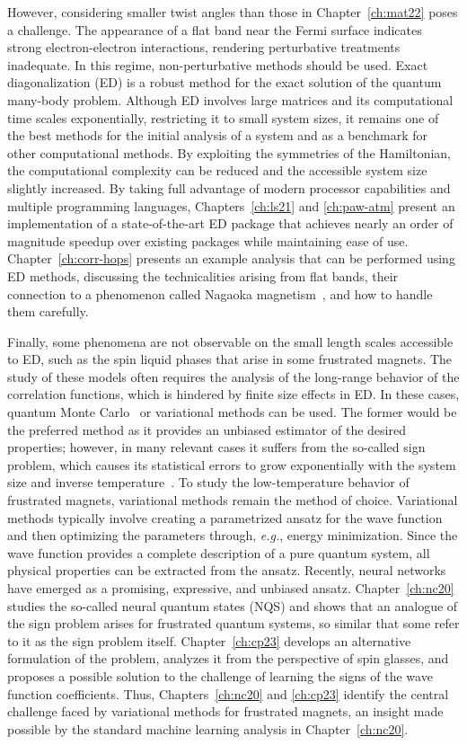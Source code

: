However, considering smaller twist angles than those in Chapter~\ref{ch:mat22} poses a challenge. The appearance of a flat band near the Fermi surface indicates strong electron-electron interactions, rendering perturbative treatments inadequate. In this regime, non-perturbative methods should be used. Exact diagonalization (ED) is a robust method for the exact solution of the quantum many-body problem. Although ED involves large matrices and its computational time scales exponentially, restricting it to small system sizes, it remains one of the best methods for the initial analysis of a system and as a benchmark for other computational methods. By exploiting the symmetries of the Hamiltonian, the computational complexity can be reduced and the accessible system size slightly increased. By taking full advantage of modern processor capabilities and multiple programming languages, Chapters~\ref{ch:ls21} and \ref{ch:paw-atm} present an implementation of a state-of-the-art ED package that achieves nearly an order of magnitude speedup over existing packages while maintaining ease of use. Chapter~\ref{ch:corr-hops} presents an example analysis that can be performed using ED methods, discussing the technicalities arising from flat bands, their connection to a phenomenon called Nagaoka magnetism~\cite{Nagaok_1966_Ferromagnetism}, and how to handle them carefully.

Finally, some phenomena are not observable on the small length scales accessible to ED, such as the spin liquid phases that arise in some frustrated magnets. The study of these models often requires the analysis of the long-range behavior of the correlation functions, which is hindered by finite size effects in ED. In these cases, quantum Monte Carlo~\cite{Sandvi_1991_Quantum_Monte_C} or variational methods can be used. The former would be the preferred method as it provides an unbiased estimator of the desired properties; however, in many relevant cases it suffers from the so-called sign problem, which causes its statistical errors to grow exponentially with the system size and inverse temperature~\cite{NP_Troyer}. To study the low-temperature behavior of frustrated magnets, variational methods remain the method of choice. Variational methods typically involve creating a parametrized ansatz for the wave function and then optimizing the parameters through, \textit{e.g.}, energy minimization. Since the wave function provides a complete description of a pure quantum system, all physical properties can be extracted from the ansatz. Recently, neural networks have emerged as a promising, expressive, and unbiased ansatz. Chapter~\ref{ch:nc20} studies the so-called neural quantum states (NQS) and shows that an analogue of the sign problem arises for frustrated quantum systems, so similar that some refer to it as the sign problem itself. Chapter~\ref{ch:cp23} develops an alternative formulation of the problem, analyzes it from the perspective of spin glasses, and proposes a possible solution to the challenge of learning the signs of the wave function coefficients. Thus, Chapters~\ref{ch:nc20} and \ref{ch:cp23} identify the central challenge faced by variational methods for frustrated magnets, an insight made possible by the standard machine learning analysis in Chapter~\ref{ch:nc20}.
